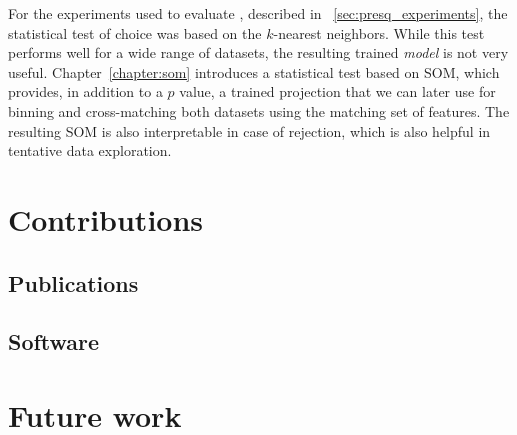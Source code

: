 For the experiments used to evaluate \PresQ, described in ~\ref{sec:presq_experiments},
the statistical test of choice was based on the $k$-nearest neighbors. While this test
performs well for a wide range of datasets, the resulting trained \emph{model} is not
very useful.
Chapter~\ref{chapter:som} introduces a statistical test based on \gls{SOM}, which provides,
in addition to a $p$ value, a trained projection that we can later use for binning and
cross-matching both datasets using the matching set of features. The resulting \gls{SOM}
is also interpretable in case of rejection, which is also helpful in tentative data exploration.

\section{Contributions}


\subsection{Publications}
\begin{refsection}
\nocite{Alvarez2019,Alvarez2021inference,AlvarezAyllonPresQ2022}

\printbibliography[heading=none]
\end{refsection}

\subsection{Software}

\section{Future work}

